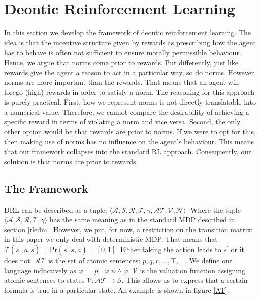 \section{Deontic Reinforcement Learning}

In this section we develop the framework of deontic reinforcement learning. The idea is that the incentive structure given by rewards as prescribing how the agent has to behave is often not sufficient to ensure morally permissible behaviour. Hence, we argue that norms come prior to rewards. Put differently, just like rewards give the agent a reason to act in a particular way, so do norms. However, norms are more important than the rewards. That means that an agent will forego (high) rewards in order to satisfy a norm. The reasoning for this approach is purely practical. First, how we represent norms is not directly translatable into a numerical value. Therefore, we cannot compare the desirability of achieving a specific reward in terms of violating a norm and vice versa. Second, the only other option would be that rewards are prior to norms. If we were to opt for this, then making use of norms has no influence on the agent's behaviour. This means that our framework collapses into the standard RL approach. Consequently, our solution is that norms are prior to rewards. 



\subsection{The Framework}

DRL can be described as a tuple: $\langle \mathcal{A,S,R,T,\gamma,AT,V,N} \rangle$. Where the tuple ${\langle \mathcal{A,S,R,T,\gamma} \rangle}$ has the same meaning as in the standard MDP described in section \ref{rledm}. However, we put, for now, a restriction on the transition matrix: in this paper we only deal with deterministic MDP. That means that $\mathcal{T}(s^{\prime},a,s) = \text{Pr}(s^{\prime} | s,a) = [0,1]$. Either taking the action leads to $s^{\prime}$ or it does not. $\mathcal{AT}$ is the set of atomic sentences: $p,q,r,\ldots,\top,\bot$. We define our language inductively as $\varphi := p | \neg \varphi | \psi \wedge \varphi$. $\mathcal{V}$ is the valuation function assigning atomic sentences to states $\mathcal{V}: \mathcal{AT} \rightarrow \mathcal{S}$. This allows us to express that a certain formula is true in a particular state. An example is shown in figure \ref{AT}.

